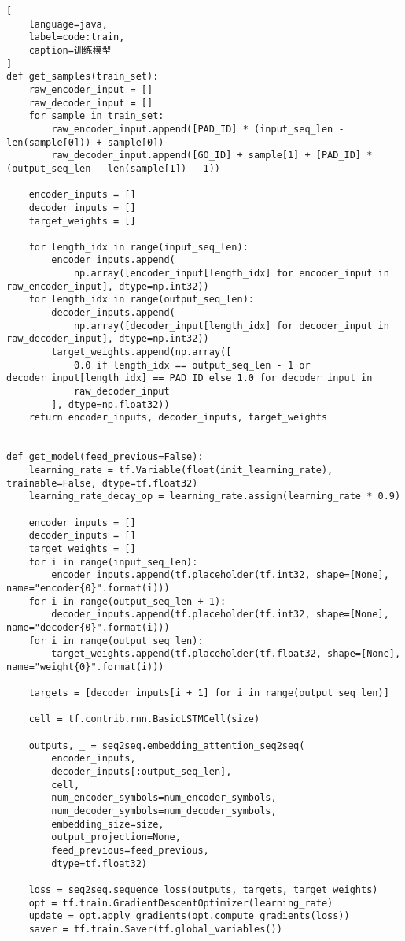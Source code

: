 \begin{appendices}
\begin{lstlisting}[
    language=java,
    label=code:train,
    caption=训练模型
]
def get_samples(train_set):
    raw_encoder_input = []
    raw_decoder_input = []
    for sample in train_set:
        raw_encoder_input.append([PAD_ID] * (input_seq_len - len(sample[0])) + sample[0])
        raw_decoder_input.append([GO_ID] + sample[1] + [PAD_ID] * (output_seq_len - len(sample[1]) - 1))

    encoder_inputs = []
    decoder_inputs = []
    target_weights = []

    for length_idx in range(input_seq_len):
        encoder_inputs.append(
            np.array([encoder_input[length_idx] for encoder_input in raw_encoder_input], dtype=np.int32))
    for length_idx in range(output_seq_len):
        decoder_inputs.append(
            np.array([decoder_input[length_idx] for decoder_input in raw_decoder_input], dtype=np.int32))
        target_weights.append(np.array([
            0.0 if length_idx == output_seq_len - 1 or decoder_input[length_idx] == PAD_ID else 1.0 for decoder_input in
            raw_decoder_input
        ], dtype=np.float32))
    return encoder_inputs, decoder_inputs, target_weights


def get_model(feed_previous=False):
    learning_rate = tf.Variable(float(init_learning_rate), trainable=False, dtype=tf.float32)
    learning_rate_decay_op = learning_rate.assign(learning_rate * 0.9)

    encoder_inputs = []
    decoder_inputs = []
    target_weights = []
    for i in range(input_seq_len):
        encoder_inputs.append(tf.placeholder(tf.int32, shape=[None], name="encoder{0}".format(i)))
    for i in range(output_seq_len + 1):
        decoder_inputs.append(tf.placeholder(tf.int32, shape=[None], name="decoder{0}".format(i)))
    for i in range(output_seq_len):
        target_weights.append(tf.placeholder(tf.float32, shape=[None], name="weight{0}".format(i)))

    targets = [decoder_inputs[i + 1] for i in range(output_seq_len)]

    cell = tf.contrib.rnn.BasicLSTMCell(size)

    outputs, _ = seq2seq.embedding_attention_seq2seq(
        encoder_inputs,
        decoder_inputs[:output_seq_len],
        cell,
        num_encoder_symbols=num_encoder_symbols,
        num_decoder_symbols=num_decoder_symbols,
        embedding_size=size,
        output_projection=None,
        feed_previous=feed_previous,
        dtype=tf.float32)

    loss = seq2seq.sequence_loss(outputs, targets, target_weights)
    opt = tf.train.GradientDescentOptimizer(learning_rate)
    update = opt.apply_gradients(opt.compute_gradients(loss))
    saver = tf.train.Saver(tf.global_variables())


\end{lstlisting}
\end{appendices}
